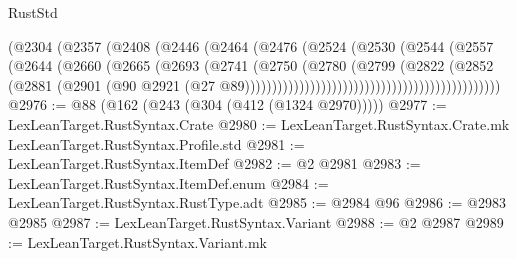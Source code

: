\begin{lexlean}{RustStd}
\begin{coremodule}
                                                  (@2304
                                                    (@2357
                                                      (@2408
                                                        (@2446
                                                          (@2464
                                                            (@2476
                                                              (@2524
                                                                (@2530
                                                                  (@2544
                                                                    (@2557
                                                                      (@2644
                                                                        (@2660
                                                                          (@2665
                                                                            (@2693
                                                                              (@2741
                                                                                (@2750
                                                                                  (@2780
                                                                                    (@2799
                                                                                      (@2822
                                                                                        (@2852
                                                                                          (@2881
                                                                                            (@2901
                                                                                              (@90
                                                                                                @2921
                                                                                                (@27
                                                                                                  @89)))))))))))))))))))))))))))))))))))))))))))))))
@2976 := @88 (@162 (@243 (@304 (@412 (@1324 @2970)))))
@2977 := LexLeanTarget.RustSyntax.Crate
@2980 := LexLeanTarget.RustSyntax.Crate.mk LexLeanTarget.RustSyntax.Profile.std
@2981 := LexLeanTarget.RustSyntax.ItemDef
@2982 := @2 @2981
@2983 := LexLeanTarget.RustSyntax.ItemDef.enum
@2984 := LexLeanTarget.RustSyntax.RustType.adt
@2985 := @2984 @96
@2986 := @2983 @2985
@2987 := LexLeanTarget.RustSyntax.Variant
@2988 := @2 @2987
@2989 := LexLeanTarget.RustSyntax.Variant.mk

\end{coremodule}
\end{lexlean}
